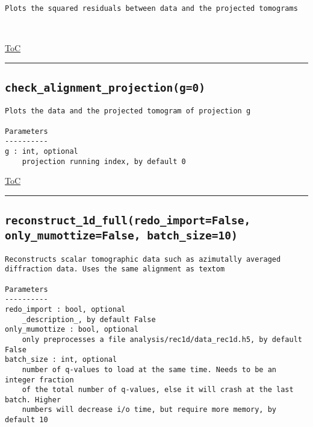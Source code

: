 \documentclass{article}
\begin{document}
\begin{lstlisting}[language=docstring]
Plots the squared residuals between data and the projected tomograms

    
\end{lstlisting}

\begin{flushright}

\hyperref[toc]{ToC}

\end{flushright}



\vspace{5mm}

\hrule

\subsection*{\texttt{check\_alignment\_projection(g=0)}}
\label{fun:checkalignmentprojection}

\begin{lstlisting}[language=docstring]
Plots the data and the projected tomogram of projection g

Parameters
----------
g : int, optional
    projection running index, by default 0
\end{lstlisting}

\begin{flushright}

\hyperref[toc]{ToC}

\end{flushright}



\vspace{5mm}

\hrule

\subsection*{\texttt{reconstruct\_1d\_full(redo\_import=False, only\_mumottize=False, batch\_size=10)}}
\label{fun:reconstruct1dfull}

\begin{lstlisting}[language=docstring]
Reconstructs scalar tomographic data such as azimutally averaged
diffraction data. Uses the same alignment as textom

Parameters
----------
redo_import : bool, optional
    _description_, by default False
only_mumottize : bool, optional
    only preprocesses a file analysis/rec1d/data_rec1d.h5, by default False
batch_size : int, optional
    number of q-values to load at the same time. Needs to be an integer fraction
    of the total number of q-values, else it will crash at the last batch. Higher
    numbers will decrease i/o time, but require more memory, by default 10
\end{lstlisting}
\end{document}
